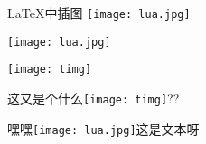 \documentclass{ctexart}
\begin{document}
    \LaTeX{}中插图
    \texttt{[image: lua.jpg]}

    \texttt{[image: lua.jpg]}

    \texttt{[image: timg]}

    这又是个什么\texttt{[image: timg]}??

    嘿嘿\texttt{[image: lua.jpg]}这是文本呀
\end{document}
